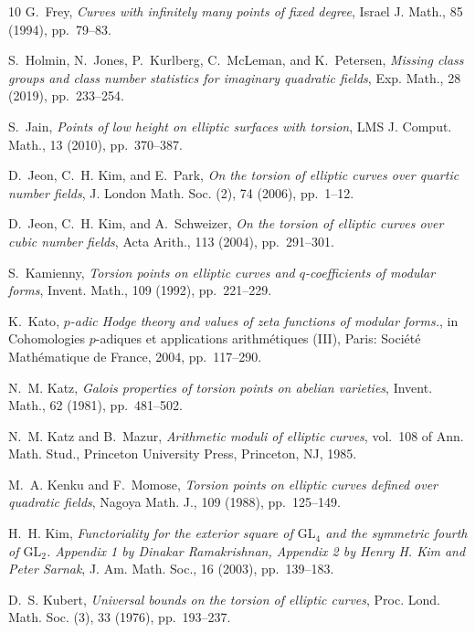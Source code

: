 \documentclass[11pt,reqno]{amsart}
\theoremstyle{definition}
\numberwithin{equation}{section}
\begin{document}
\begin{thebibliography}{10}
{\sc G.~Frey}, {\em Curves with infinitely many points of fixed degree}, Israel J. Math., 85 (1994), pp.~79--83.

{\sc S.~Holmin, N.~Jones, P.~Kurlberg, C.~McLeman, and K.~Petersen}, {\em Missing class groups and class number statistics for imaginary quadratic fields}, Exp. Math., 28 (2019), pp.~233--254.

{\sc S.~Jain}, {\em Points of low height on elliptic surfaces with torsion}, LMS J. Comput. Math., 13 (2010), pp.~370--387.

{\sc D.~Jeon, C.~H. Kim, and E.~Park}, {\em On the torsion of elliptic curves over quartic number fields}, J. London Math. Soc. (2), 74 (2006), pp.~1--12.

{\sc D.~Jeon, C.~H. Kim, and A.~Schweizer}, {\em On the torsion of elliptic curves over cubic number fields}, Acta Arith., 113 (2004), pp.~291--301.

{\sc S.~Kamienny}, {\em Torsion points on elliptic curves and {$q$}-coefficients of modular forms}, Invent. Math., 109 (1992), pp.~221--229.

{\sc K.~Kato}, {\em {{\(p\)}}-adic {Hodge} theory and values of zeta functions of modular forms.}, in Cohomologies \(p\)-adiques et applications arithm\'etiques (III), Paris: Soci{\'e}t{\'e} Math{\'e}matique de France, 2004, pp.~117--290.

{\sc N.~M. Katz}, {\em Galois properties of torsion points on abelian varieties}, Invent. Math., 62 (1981), pp.~481--502.

{\sc N.~M. Katz and B.~Mazur}, {\em Arithmetic moduli of elliptic curves}, vol.~108 of Ann. Math. Stud., Princeton University Press, Princeton, NJ, 1985.

{\sc M.~A. Kenku and F.~Momose}, {\em Torsion points on elliptic curves defined over quadratic fields}, Nagoya Math. J., 109 (1988), pp.~125--149.

{\sc H.~H. Kim}, {\em Functoriality for the exterior square of {{\(\text{GL}_4\)}} and the symmetric fourth of {{\(\text{GL}_2\)}}. {Appendix} 1 by {Dinakar} {Ramakrishnan}, {Appendix} 2 by {Henry} {H}. {Kim} and {Peter} {Sarnak}}, J. Am. Math. Soc., 16 (2003), pp.~139--183.

{\sc D.~S. Kubert}, {\em Universal bounds on the torsion of elliptic curves}, Proc. Lond. Math. Soc. (3), 33 (1976), pp.~193--237.


\end{thebibliography}
\end{document}
